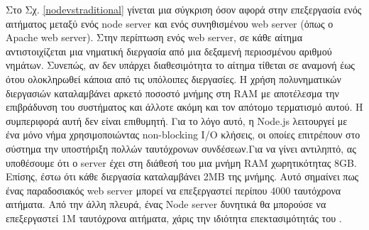 Στο Σχ. \ref{nodevstraditional} γίνεται μια σύγκριση όσον αφορά στην επεξεργασία ενός αιτήματος μεταξύ ενός node server και ενός συνηθισμένου web server (όπως ο Apache web server). Στην περίπτωση ενός web server, σε κάθε αίτημα αντιστοιχίζεται μια νηματική διεργασία από μια δεξαμενή περιοσμένου αριθμού νημάτων. Συνεπώς, αν δεν υπάρχει διαθεσιμότητα το αίτημα τίθεται σε αναμονή έως ότου ολοκληρωθεί κάποια από τις υπόλοιπες διεργασίες. 
Η χρήση πολυνηματικών διεργασιών καταλαμβάνει αρκετό ποσοστό μνήμης στη RAM με αποτέλεσμα την επιβράδυνση του συστήματος και άλλοτε ακόμη και τον απότομο τερματισμό αυτού. Η συμπεριφορά αυτή δεν είναι επιθυμητή. Για το λόγο αυτό, η Node.js λειτουργεί με ένα μόνο νήμα χρησιμοποιώντας non-blocking I/O κλήσεις, οι οποίες επιτρέπουν στο σύστημα την υποστήριξη πολλών ταυτόχρονων συνδέσεων.Για να γίνει αντιληπτό, ας υποθέσουμε ότι ο server έχει στη διάθεσή του μια μνήμη RAM χωρητικότητας 8GB. Επίσης, έστω ότι κάθε διεργασία καταλαμβάνει 2MB της μνήμης. Αυτό σημαίνει πως ένας παραδοσιακός web server μπορεί να επεξεργαστεί περίπου 4000 ταυτόχρονα αιτήματα. Από την άλλη πλευρά, ένας Node server δυνητικά θα μπορούσε να επεξεργαστεί 1M ταυτόχρονα αιτήματα, χάρις την ιδιότητα επεκτασιμότητάς του \cite{[NODE1]}.

